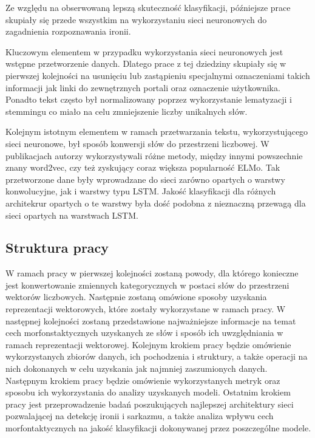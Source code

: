 Ze względu na obserwowaną lepszą skuteczność klasyfikacji, późniejsze prace skupiały się przede wszystkim na wykorzystaniu sieci neuronowych do zagadnienia rozpoznawania ironii.

Kluczowym elementem w przypadku wykorzystania sieci neuronowych jest wstępne przetworzenie danych. Dlatego prace \cite{Baziotis2018}  \cite{Huang2017}  \cite{Ilic2018} z tej dziedziny skupiały się w pierwszej kolejności na usunięciu lub zastąpieniu specjalnymi oznaczeniami takich informacji jak linki do zewnętrznych portali oraz oznaczenie użytkownika. Ponadto tekst często był normalizowany poprzez wykorzystanie lematyzacji i stemmingu co miało na celu zmniejszenie liczby unikalnych słów. 

Kolejnym istotnym elementem w ramach przetwarzania tekstu, wykorzystującego sieci neuronowe, był sposób konwersji słów do przestrzeni liczbowej. W publikacjach autorzy wykorzystywali różne metody, między innymi powszechnie znany word2vec, czy też zyskujący coraz większa popularność ELMo. Tak przetworzone dane były wprowadzane do sieci zarówno opartych o warstwy konwolucyjne, jak i warstwy typu LSTM. Jakość klasyfikacji dla różnych architekrur opartych o te warstwy była dość podobna z nieznaczną przewagą dla sieci opartych na warstwach LSTM.


\subsection{Struktura pracy}

W ramach pracy w pierwszej kolejności zostaną powody, dla którego konieczne jest konwertowanie zmiennych kategorycznych w postaci słów do przestrzeni wektorów liczbowych. Następnie zostaną omówione sposoby uzyskania reprezentacji wektorowych, które zostały wykorzystane w ramach pracy. W następnej kolejności zostaną przedstawione najważniejsze informacje na temat cech morfonstaktycznych uzyskanych ze słów i sposób ich uwzględniania w ramach reprezentacji wektorowej. Kolejnym krokiem pracy będzie omówienie wykorzystanych zbiorów danych, ich pochodzenia i struktury, a także operacji na nich dokonanych w celu uzyskania jak najmniej zaszumionych danych. Następnym krokiem pracy będzie omówienie wykorzystanych metryk oraz sposobu ich wykorzystania do analizy uzyskanych modeli. Ostatnim krokiem pracy jest przeprowadzenie badań poszukujących najlepszej architektury sieci pozwalającej na detekcję ironii i sarkazmu, a także analiza wpływu cech morfontaktycznych na jakość klasyfikacji dokonywanej przez poszczególne modele. 
